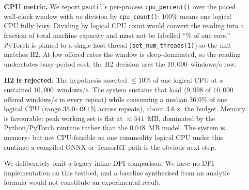 \documentclass[conference,a4paper]{IEEEtran}
\begin{document}
\textbf{CPU metric.} We report \texttt{psutil}'s per-process \texttt{cpu\_percent()} over the paced wall-clock window with \emph{no} division by \texttt{cpu\_count()}: $100\%$ means one logical CPU fully busy. Dividing by logical CPU count would convert the reading into a fraction of total machine capacity and must not be labelled ``\% of one core.'' PyTorch is pinned to a single host thread (\texttt{set\_num\_threads(1)}) so the unit matches H2. At low offered rates the window is sleep-dominated, so the reading understates busy-period cost; the H2 decision uses the $10{,}000$~windows/s row.

\textbf{H2 is rejected.} The hypothesis asserted $\le 10\%$ of one logical CPU at a sustained $10{,}000$~windows/s. The system sustains that load ($9{,}998$ of $10{,}000$ offered windows/s in every repeat) while consuming a median $36.0\%$ of one logical CPU (range $35.0$--$49.1\%$ across repeats), about $3.6\times$ the budget. Memory is favourable: peak working set is flat at $\approx 541$~MB, dominated by the Python/PyTorch runtime rather than the $0.048$~MB model. The system is memory- but not CPU-feasible on one commodity logical CPU under this runtime; a compiled ONNX or TensorRT path is the obvious next step.

We deliberately omit a legacy inline-DPI comparison. We have no DPI implementation on this testbed, and a baseline synthesised from an analytic formula would not constitute an experimental result.

\begin{table}[htbp]
\caption{Edge Cost at Paced Offered Load (batch $=128$, \texttt{torch.set\_num\_threads(1)}), median of $5$ repeats. CPU is \% of one logical CPU ($100\%=$ one core busy) over the paced wall-clock window, including rate-limit sleeps. \textbf{Load Met} means every repeat achieved at least $95\%$ of the offered throughput target; it is not the H2 CPU-budget decision.}
\label{tab:resource}
\begin{center}
\end{center}
\end{table}
\end{document}

